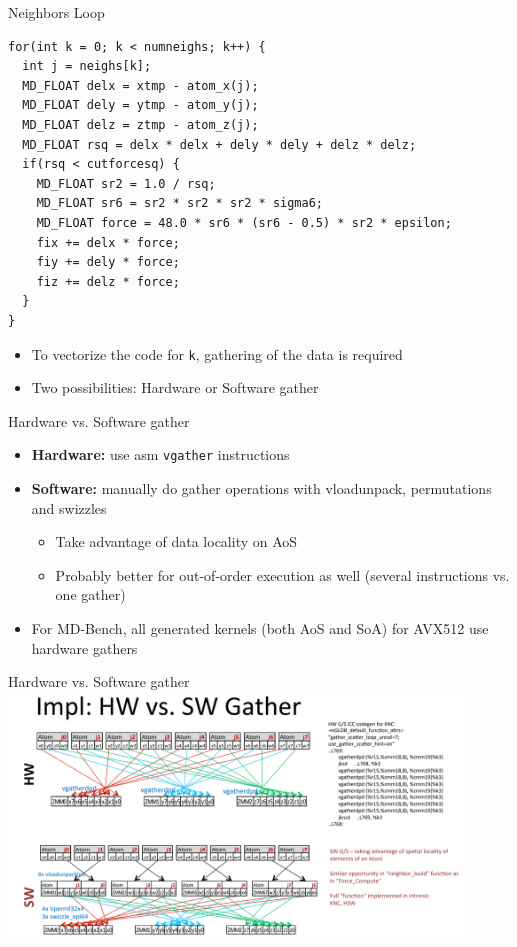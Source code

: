 \documentclass[aspectratio=43,t]{beamer}
\begin{document}
  \begin{frame}[fragile]{Neighbors Loop}
    \begin{lstlisting}
for(int k = 0; k < numneighs; k++) {
  int j = neighs[k];
  MD_FLOAT delx = xtmp - atom_x(j);
  MD_FLOAT dely = ytmp - atom_y(j);
  MD_FLOAT delz = ztmp - atom_z(j);
  MD_FLOAT rsq = delx * delx + dely * dely + delz * delz;
  if(rsq < cutforcesq) {
    MD_FLOAT sr2 = 1.0 / rsq;
    MD_FLOAT sr6 = sr2 * sr2 * sr2 * sigma6;
    MD_FLOAT force = 48.0 * sr6 * (sr6 - 0.5) * sr2 * epsilon;
    fix += delx * force;
    fiy += dely * force;
    fiz += delz * force;
  }
}
    \end{lstlisting}
    \begin{itemize}
      \item To vectorize the code for \texttt{k}, gathering of the data is required
      \item Two possibilities: Hardware or Software gather
    \end{itemize}
  \end{frame}

  \begin{frame}[fragile]{Hardware vs. Software gather}
    \begin{itemize}
      \item \textbf{Hardware:} use asm \texttt{vgather} instructions
      \item \textbf{Software:} manually do gather operations with vloadunpack, permutations and swizzles
      \begin{itemize}
        \item Take advantage of data locality on AoS
        \item Probably better for out-of-order execution as well (several instructions vs. one gather)
      \end{itemize}
      \item For MD-Bench, all generated kernels (both AoS and SoA) for AVX512 use hardware gathers
    \end{itemize}
  \end{frame}

  \begin{frame}[fragile]{Hardware vs. Software gather}
  \centering
    \includegraphics[width=12cm]{hw_vs_sw_gather_md.png}
  \end{frame}
\end{document}
